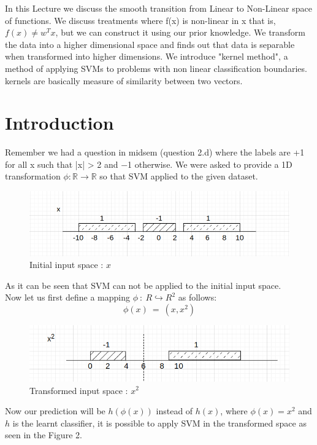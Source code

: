 \documentclass[12pt]{article}
\begin{document}
\MakeScribeTop



In this Lecture we discuss the smooth transition from Linear to Non-Linear space of functions. We discuss treatments where f(x) is non-linear in x that is, $f(x) \neq w^{T}x$, but we can construct it using our prior knowledge. We transform the data into a higher dimensional space and finds out that data is separable when transformed into higher dimensions.
We introduce "kernel method", a method of applying SVMs to problems with non linear classification boundaries. kernels are basically measure of similarity between two vectors.

\section{Introduction}
Remember we had a question in midsem (question 2.d) where the labels are +1 for all x such that |x| > 2 and −1 otherwise. We were asked to provide a 1D transformation $\phi : \mathbb{R} \rightarrow \mathbb{R}$  so that SVM applied to the given dataset. 
\begin{figure}[h]
\centering
\includegraphics[width=0.9\linewidth]{input.png}
\caption{Initial input space : $x$} 
\end{figure} \newline
As it can be seen that SVM can not be applied to the initial input space. \\ 
Now let us first define a mapping $\phi\ :\ R \hookrightarrow R^2$ as follows:
\large{ 
\[
    \phi(x)\ =\ (x,x^2)
\]}
\begin{figure}[h]
\centering
\includegraphics[width=0.9\linewidth]{transformed.png}
\caption{Transformed input space : $x^2$} 
\end{figure} 
Now our prediction will be $h(\phi(x))$ instead of $h(x)$, where $\phi(x) =x^2$ and $h$ is the learnt classifier, it is possible to apply SVM in the transformed space as seen in the Figure 2. \\
\end{document}
